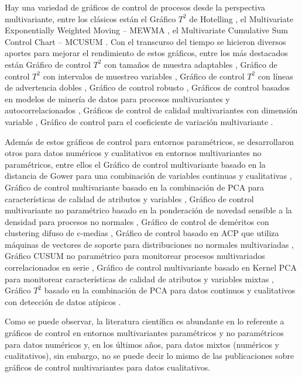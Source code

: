 \documentclass[water,article,submit,moreauthors,pdftex]{mdpi}
\begin{document}
Hay una variedad de gráficos de control de procesos desde la perspectiva
multivariante, entre los clásicos están el Gráfico \(T^2\) de Hotelling
\citep{hotelling1947}, el Multivariate Exponentially Weighted Moving --
MEWMA \citep{lowry1992}, el Multivariate Cumulative Sum Control Chart --
MCUSUM \citep{Crosier1988}. Con el transcurso del tiempo se hicieron
diversos aportes para mejorar el rendimiento de estos gráficos, entre
los más destacados están Gráfico de control \(T^2\) con tamaños de
muestra adaptables \citep{Aparisi1996}, Gráfico de control \(T^2\) con
intervalos de muestreo variables \citep{Aparisi2001}, Gráfico de control
\(T^2\) con líneas de advertencia dobles \citep{Faraz2006}, Gráfico de
control robusto \citep{shabbak2012}, Gráficos de control basados en
modelos de minería de datos para procesos multivariantes y
autocorrelacionados \citep{kim2012}, Gráficos de control de calidad
multivariantes con dimensión variable \citep{ruiz2013}, Gráfico de
control para el coeficiente de variación multivariante
\citep{yeong2016}.

Además de estos gráficos de control para entornos paramétricos, se
desarrollaron otros para datos numéricos y cualitativos en entornos
multivariantes no paramétricos, entre ellos el Gráfico de control
multivariante basado en la distancia de Gower para una combinación de
variables continuas y cualitativas \citep{Tuerhong2014}, Gráfico de
control multivariante basado en la combinación de PCA para
características de calidad de atributos y variables
\citep{Muhammad2018}, Gráfico de control multivariante no paramétrico
basado en la ponderación de novedad sensible a la densidad para procesos
no normales \citep{liu2020}, Gráfico de control de deméritos con
clustering difuso de c-medias \citep{yilmaz2020}, Gráfico de control
basado en ACP que utiliza máquinas de vectores de soporte para
distribuciones no normales multivariadas \citep{Farokhnia}, Gráfico
CUSUM no paramétrico para monitorear procesos multivariados
correlacionados en serie \citep{xue2020}, Gráfico de control
multivariante basado en Kernel PCA para monitorear características de
calidad de atributos y variables mixtas \citep{Ahsan2020}, Gráfico
\(T^2\) basado en la combinación de PCA para datos continuos y
cualitativos con detección de datos atípicos \citep{Ahsan2021}.

Como se puede observar, la literatura científica es abundante en lo
referente a gráficos de control en entornos multivariantes paramétricos
y no paramétricos para datos numéricos y, en los últimos años, para
datos mixtos (numéricos y cualitativos), sin embargo, no se puede decir
lo mismo de las publicaciones sobre gráficos de control multivariantes
para datos cualitativos.
\end{document}
